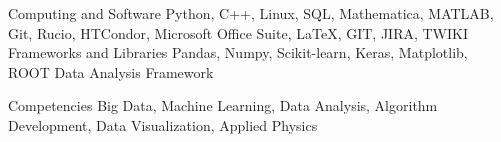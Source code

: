 
\begin{cvskills}
  \cvskill
    {Computing and Software} %
    {Python, C++, Linux, SQL, Mathematica, MATLAB, Git, Rucio, HTCondor, Microsoft Office Suite, \LaTeX, GIT, JIRA, TWIKI} %
     \cvskill
    {Frameworks and Libraries} %
    {Pandas, Numpy, Scikit-learn, Keras, Matplotlib, ROOT Data Analysis Framework} %


  \cvskill
    {Competencies} %
    {Big Data, Machine Learning, Data Analysis, Algorithm Development, Data Visualization, Applied Physics} %

\end{cvskills}

